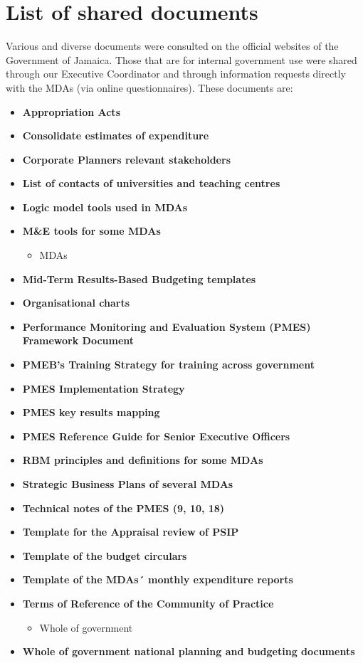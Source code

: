 \documentclass[
  10pt,
]{book}
\providecommand{\tightlist}{%
  \setlength{\itemsep}{0pt}\setlength{\parskip}{0pt}}
\begin{document}
\hypertarget{appendixE}{%
\chapter{List of shared documents}\label{appendixE}}

Various and diverse documents were consulted on the official websites of the Government of Jamaica. Those that are for internal government use were shared through our Executive Coordinator and through information requests directly with the MDAs (via online questionnaires). These documents are:

\begin{itemize}
\tightlist
\item
  \textbf{Appropriation Acts}
\item
  \textbf{Consolidate estimates of expenditure}
\item
  \textbf{Corporate Planners relevant stakeholders}
\item
  \textbf{List of contacts of universities and teaching centres}
\item
  \textbf{Logic model tools used in MDAs}
\item
  \textbf{M\&E tools for some MDAs}

  \begin{itemize}
  \tightlist
  \item
    MDAs
  \end{itemize}
\item
  \textbf{Mid-Term Results-Based Budgeting templates}
\item
  \textbf{Organisational charts}
\item
  \textbf{Performance Monitoring and Evaluation System (PMES) Framework Document}
\item
  \textbf{PMEB's Training Strategy for training across government}
\item
  \textbf{PMES Implementation Strategy}
\item
  \textbf{PMES key results mapping}
\item
  \textbf{PMES Reference Guide for Senior Executive Officers}
\item
  \textbf{RBM principles and definitions for some MDAs}
\item
  \textbf{Strategic Business Plans of several MDAs}
\item
  \textbf{Technical notes of the PMES (9, 10, 18)}
\item
  \textbf{Template for the Appraisal review of PSIP}
\item
  \textbf{Template of the budget circulars}
\item
  \textbf{Template of the MDAs´ monthly expenditure reports}
\item
  \textbf{Terms of Reference of the Community of Practice}

  \begin{itemize}
  \tightlist
  \item
    Whole of government
  \end{itemize}
\item
  \textbf{Whole of government national planning and budgeting documents}
\end{itemize}

  
\end{document}
